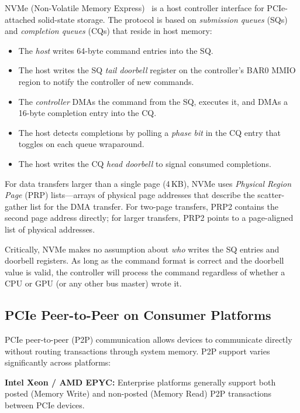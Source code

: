 \documentclass{article}
\begin{document}
NVMe (Non-Volatile Memory Express)~\cite{nvme-spec} is a host controller
interface for PCIe-attached solid-state storage. The protocol is based on
\emph{submission queues} (SQs) and \emph{completion queues} (CQs) that reside
in host memory:

\begin{itemize}[leftmargin=*,topsep=2pt,itemsep=1pt]
\item The \emph{host} writes 64-byte command entries into the SQ.
\item The host writes the SQ \emph{tail doorbell} register on the controller's
  BAR0 MMIO region to notify the controller of new commands.
\item The \emph{controller} DMAs the command from the SQ, executes it, and
  DMAs a 16-byte completion entry into the CQ.
\item The host detects completions by polling a \emph{phase bit} in the CQ
  entry that toggles on each queue wraparound.
\item The host writes the CQ \emph{head doorbell} to signal consumed
  completions.
\end{itemize}

For data transfers larger than a single page (4\,KB), NVMe uses
\emph{Physical Region Page} (PRP) lists---arrays of physical page addresses
that describe the scatter-gather list for the DMA transfer. For two-page
transfers, PRP2 contains the second page address directly; for larger
transfers, PRP2 points to a page-aligned list of physical addresses.

Critically, NVMe makes no assumption about \emph{who} writes the SQ entries
and doorbell registers. As long as the command format is correct and the
doorbell value is valid, the controller will process the command regardless of
whether a CPU or GPU (or any other bus master) wrote it.

\subsection{PCIe Peer-to-Peer on Consumer Platforms}

PCIe peer-to-peer (P2P) communication allows devices to communicate directly
without routing transactions through system memory. P2P support varies
significantly across platforms:

\textbf{Intel Xeon / AMD EPYC:} Enterprise platforms generally support both
posted (Memory Write) and non-posted (Memory Read) P2P transactions between
PCIe devices.
\end{document}
